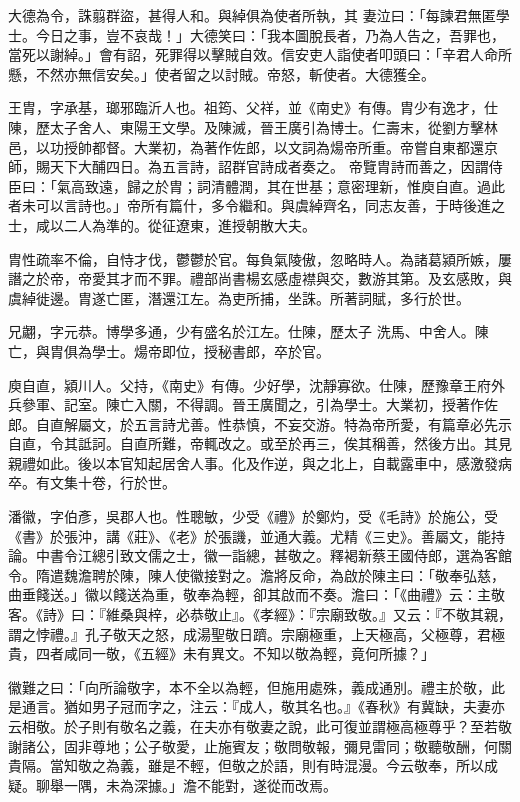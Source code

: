 \begin{pinyinscope}
 大德為令，誅翦群盜，甚得人和。與綽俱為使者所執，其
 妻泣曰：「每諫君無匿學士。今日之事，豈不哀哉！」大德笑曰：「我本圖脫長者，乃為人告之，吾罪也，當死以謝綽。」會有詔，死罪得以擊賊自效。信安吏人詣使者叩頭曰：「辛君人命所懸，不然亦無信安矣。」使者留之以討賊。帝怒，斬使者。大德獲全。



 王胄，字承基，瑯邪臨沂人也。祖筠、父祥，並《南史》有傳。胄少有逸才，仕陳，歷太子舍人、東陽王文學。及陳滅，晉王廣引為博士。仁壽末，從劉方擊林邑，以功授帥都督。大業初，為著作佐郎，以文詞為煬帝所重。帝嘗自東都還京師，賜天下大酺四日。為五言詩，詔群官詩成者奏之。
 帝覽胄詩而善之，因謂侍臣曰：「氣高致遠，歸之於胄；詞清體潤，其在世基；意密理新，惟庾自直。過此者未可以言詩也。」帝所有篇什，多令繼和。與虞綽齊名，同志友善，于時後進之士，咸以二人為準的。從征遼東，進授朝散大夫。



 胄性疏率不倫，自恃才伐，鬱鬱於官。每負氣陵傲，忽略時人。為諸葛潁所嫉，屢譖之於帝，帝愛其才而不罪。禮部尚書楊玄感虛襟與交，數游其第。及玄感敗，與虞綽徙邊。胄遂亡匿，潛還江左。為吏所捕，坐誅。所著詞賦，多行於世。



 兄翽，字元恭。博學多通，少有盛名於江左。仕陳，歷太子
 洗馬、中舍人。陳亡，與胄俱為學士。煬帝即位，授秘書郎，卒於官。



 庾自直，潁川人。父持，《南史》有傳。少好學，沈靜寡欲。仕陳，歷豫章王府外兵參軍、記室。陳亡入關，不得調。晉王廣聞之，引為學士。大業初，授著作佐郎。自直解屬文，於五言詩尤善。性恭慎，不妄交游。特為帝所愛，有篇章必先示自直，令其詆訶。自直所難，帝輒改之。或至於再三，俟其稱善，然後方出。其見親禮如此。後以本官知起居舍人事。化及作逆，與之北上，自載露車中，感激發病卒。有文集十卷，行於世。



 潘徽，字伯彥，吳郡人也。性聰敏，少受《禮》於鄭灼，受《毛詩》於施公，受《書》於張沖，講《莊》、《老》於張譏，並通大義。尤精《三史》。善屬文，能持論。中書令江總引致文儒之士，徽一詣總，甚敬之。釋褐新蔡王國侍郎，選為客館令。隋遣魏澹聘於陳，陳人使徽接對之。澹將反命，為啟於陳主曰：「敬奉弘慈，曲垂餞送。」徽以餞送為重，敬奉為輕，卻其啟而不奏。澹曰：「《曲禮》云：主敬客。《詩》曰：『維桑與梓，必恭敬止』。《孝經》：『宗廟致敬。』又云：『不敬其親，謂之悖禮。』孔子敬天之怒，成湯聖敬日躋。宗廟極重，上天極高，父極尊，君極貴，四者咸同一敬，《五經》未有異文。不知以敬為輕，竟何所據？」



 徽難之曰：「向所論敬字，本不全以為輕，但施用處殊，義成通別。禮主於敬，此是通言。猶如男子冠而字之，注云：『成人，敬其名也。』《春秋》有冀缺，夫妻亦云相敬。於子則有敬名之義，在夫亦有敬妻之說，此可復並謂極高極尊乎？至若敬謝諸公，固非尊地；公子敬愛，止施賓友；敬問敬報，彌見雷同；敬聽敬酬，何關貴隔。當知敬之為義，雖是不輕，但敬之於語，則有時混漫。今云敬奉，所以成疑。聊舉一隅，未為深據。」澹不能對，遂從而改焉。




\end{pinyinscope}
